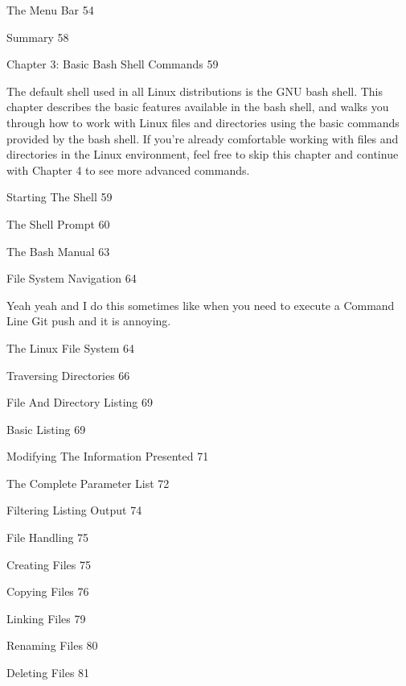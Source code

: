 The Menu Bar 54



Summary 58



Chapter 3: Basic Bash Shell Commands 59

The default shell used in all Linux distributions is the GNU bash shell. This chapter describes the basic features available in the bash shell, and walks you through how to work with Linux files and directories using the basic commands provided by the bash shell. If you're already comfortable working with files and directories in the Linux environment, feel free to skip this chapter and continue with Chapter 4 to see more advanced commands.

Starting The Shell 59



The Shell Prompt 60



The Bash Manual 63



File System Navigation 64

Yeah yeah and I do this sometimes like when you need to execute a Command Line Git push and it is annoying.

The Linux File System 64



Traversing Directories 66



File And Directory Listing 69



Basic Listing 69



Modifying The Information Presented 71



The Complete Parameter List 72



Filtering Listing Output 74



File Handling 75



Creating Files 75



Copying Files 76



Linking Files 79



Renaming Files 80



Deleting Files 81




